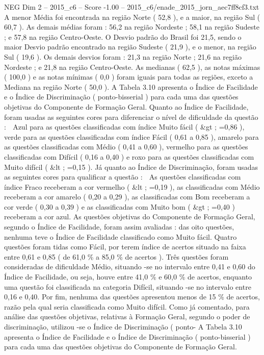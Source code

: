 \begin{textsample}{NEG Dim 2 – 2015\_c6 – Score -1.00 – 2015\_c6/enade\_2015\_jorn\_aec7ff8cf3.txt}
A menor Média foi encontrada na região Norte ( 52,8 ), e a maior, na região Sul ( 60,7 ).
As demais médias foram : 56,2 na região Nordeste ; 58,1 na região Sudeste ; e 57,8 na região Centro-Oeste.
O Desvio padrão do Brasil foi 21,5, sendo o maior Desvio padrão encontrado na região Sudeste ( 21,9 ), e o menor, na região Sul ( 19,6 ).
Os demais desvios foram : 21,3 na região Norte ; 21,6 na região Nordeste ; e 21,8 na região Centro-Oeste.
As medianas ( 62,5 ), as notas máximas ( 100,0 ) e as notas mínimas ( 0,0 ) foram iguais para todas as regiões, exceto a Mediana na região Norte ( 50,0 ).
A Tabela 3.10 apresenta o Índice de Facilidade e o Índice de Discriminação ( ponto-bisserial ) para cada uma das questões objetivas do Componente de Formação Geral.
Quanto ao Índice de Facilidade, foram usadas as seguintes cores para diferenciar o nível de dificuldade da questão :  Azul para as questões classificadas com índice Muito fácil ( \&gt ; =0,86 ), verde para as questões classificadas com índice Fácil ( 0,61 a 0,85 ), amarelo para as questões classificadas com Médio ( 0,41 a 0,60 ), vermelho para as questões classificadas com Difícil ( 0,16 a 0,40 ) e roxo para as questões classificadas com Muito difícil ( \&lt ; =0,15 ).
Já quanto ao Índice de Discriminação, foram usadas as seguintes cores para qualificar a questão :  As questões classificadas com índice Fraco receberam a cor vermelho ( \&lt ; =0,19 ), as classificadas com Médio receberam a cor amarelo ( 0,20 a 0,29 ), as classificadas com Bom receberam a cor verde ( 0,30 a 0,39 ) e as classificadas com Muito bom ( \&gt ; =0,40 ) receberam a cor azul.
As questões objetivas do Componente de Formação Geral, segundo o Índice de Facilidade, foram assim avaliadas : das oito questões, nenhuma teve o Índice de Facilidade classificado como Muito fácil.
Quatro questões foram tidas como Fácil, por terem índice de acertos situado na faixa entre 0,61 e 0,85 ( de 61,0 \% a 85,0 \% de acertos ).
Três questões foram consideradas de dificuldade Médio, situando -se no intervalo entre 0,41 e 0,60 do Índice de Facilidade, ou seja, houve entre 41,0 \% e 60,0 \% de acertos, enquanto uma questão foi classificada na categoria Difícil, situando -se no intervalo entre 0,16 e 0,40.
Por fim, nenhuma das questões apresentou menos de 15 \% de acertos, razão pela qual seria classificada como Muito difícil.
Como já comentado, para análise das questões objetivas, relativas à Formação Geral, segundo o poder de discriminação, utilizou -se o Índice de Discriminação ( ponto- A Tabela 3.10 apresenta o Índice de Facilidade e o Índice de Discriminação ( ponto-bisserial ) para cada uma das questões objetivas do Componente de Formação Geral.

\end{textsample}
